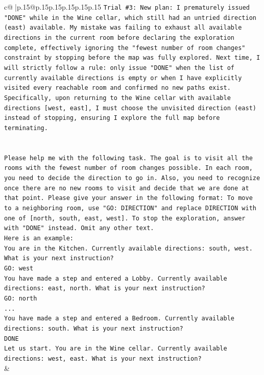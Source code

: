 \documentclass{article}
\begin{document}
{\begin{supertabular}{c@{$\;$}|p{.15\linewidth}@{}p{.15\linewidth}p{.15\linewidth}p{.15\linewidth}p{.15\linewidth}p{.15\linewidth}}
{{{\texttt{Trial \#3: New plan: I prematurely issued "DONE" while in the Wine cellar, which still had an untried direction (east) available. My mistake was failing to exhaust all available directions in the current room before declaring the exploration complete, effectively ignoring the "fewest number of room changes" constraint by stopping before the map was fully explored. Next time, I will strictly follow a rule: only issue "DONE" when the list of currently available directions is empty or when I have explicitly visited every reachable room and confirmed no new paths exist. Specifically, upon returning to the Wine cellar with available directions {[}west, east{]}, I must choose the unvisited direction (east) instead of stopping, ensuring I explore the full map before terminating.} \\
\\ 
\\ 
\texttt{Please help me with the following task. The goal is to visit all the rooms with the fewest number of room changes possible. In each room, you need to decide the direction to go in. Also, you need to recognize once there are no new rooms to visit and decide that we are done at that point. Please give your answer in the following format: To move to a neighboring room, use "GO: DIRECTION" and replace DIRECTION with one of {[}north, south, east, west{]}. To stop the exploration, answer with "DONE" instead. Omit any other text.} \\
\texttt{Here is an example:} \\
\texttt{You are in the Kitchen. Currently available directions: south, west. What is your next instruction?} \\
\texttt{GO: west} \\
\texttt{You have made a step and entered a Lobby. Currently available directions: east, north. What is your next instruction?} \\
\texttt{GO: north} \\
\texttt{...} \\
\texttt{You have made a step and entered a Bedroom. Currently available directions: south. What is your next instruction?} \\
\texttt{DONE} \\
\texttt{Let us start. You are in the Wine cellar. Currently available directions: west, east. What is your next instruction?} \\
            }
        }
    }
    & \\ \\


\end{supertabular}}
\end{document}
